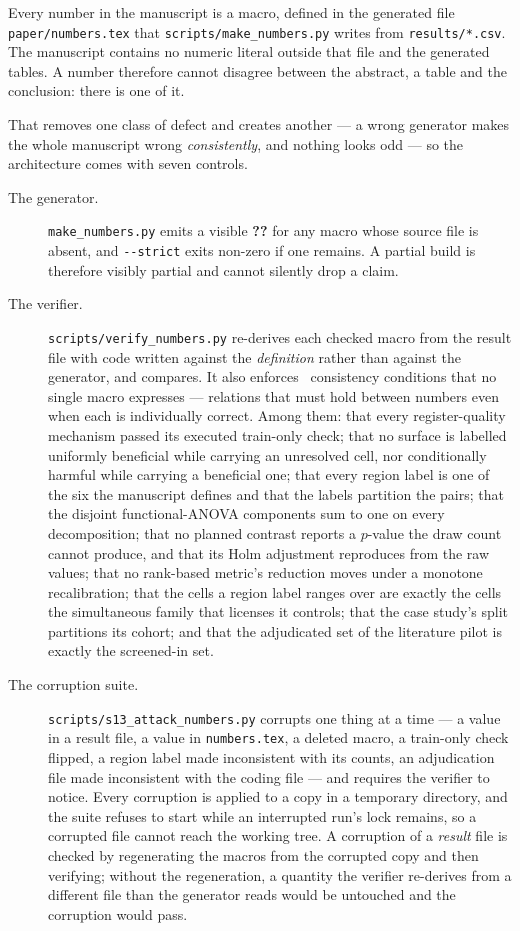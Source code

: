 
Every number in the manuscript is a macro, defined in the generated file
\texttt{paper/numbers.tex} that \texttt{scripts/make\_numbers.py} writes
from \texttt{results/*.csv}. The manuscript contains no numeric literal
outside that file and the generated tables. A number therefore cannot disagree
between the abstract, a table and the conclusion: there is one of it.

That removes one class of defect and creates another --- a wrong generator
makes the whole manuscript wrong \emph{consistently}, and nothing looks odd
--- so the architecture comes with seven controls.

\begin{description}
\item[The generator.] \texttt{make\_numbers.py} emits a visible
\textbf{??} for any macro whose source file is absent, and
\texttt{-{}-strict} exits non-zero if one remains. A partial build is
therefore visibly partial and cannot silently drop a claim.

\item[The verifier.] \texttt{scripts/verify\_numbers.py} re-derives each
checked macro from the result file with code written against the
\emph{definition} rather than against the generator, and compares. It also
enforces \nConditions\ consistency conditions that no single macro expresses
--- relations that must hold between numbers even when each is individually
correct. Among them: that every register-quality mechanism passed its
executed train-only check; that no surface is labelled uniformly beneficial
while carrying an unresolved cell, nor conditionally harmful while carrying a
beneficial one; that every region label is one of the six the manuscript
defines and that the labels partition the pairs; that the disjoint
functional-ANOVA components sum to one on every decomposition; that no
planned contrast reports a $p$-value the draw count cannot produce, and that
its Holm adjustment reproduces from the raw values; that no rank-based
metric's reduction moves under a monotone recalibration; that the cells a
region label ranges over are exactly the cells the simultaneous family that
licenses it controls; that the case study's split partitions its cohort; and
that the adjudicated set of the literature pilot is exactly the screened-in
set.

\item[The corruption suite.] \texttt{scripts/s13\_attack\_numbers.py}
corrupts one thing at a time --- a value in a result file, a value in
\texttt{numbers.tex}, a deleted macro, a train-only check flipped, a region
label made inconsistent with its counts, an adjudication file made
inconsistent with the coding file --- and requires the verifier to notice.
Every corruption is applied to a copy in a temporary directory, and the suite
refuses to start while an interrupted run's lock remains, so a corrupted file
cannot reach the working tree. A corruption of a \emph{result} file is
checked by regenerating the macros from the corrupted copy and then
verifying; without the regeneration, a quantity the verifier re-derives from
a different file than the generator reads would be untouched and the
corruption would pass.


\end{description}
